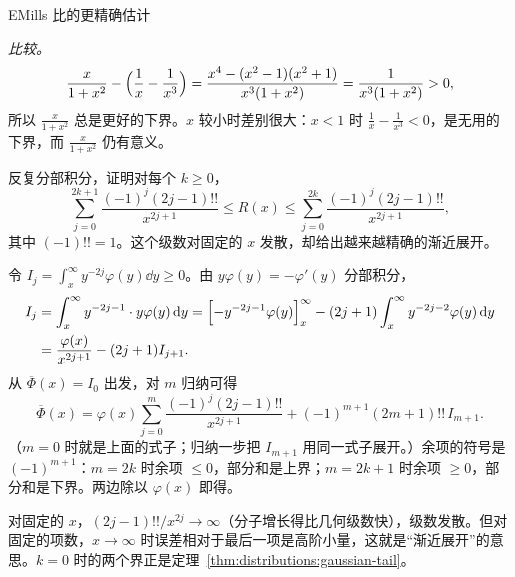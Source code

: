 \begin{probleme}[问题]{E}{Mills 比的更精确估计}
\begin{questions}
\begin{solution}
\emph{比较。}
\[
\frac x{1+x^2}-\Bigl(\frac1x-\frac1{x^3}\Bigr)=\frac{x^4-(x^2-1)(x^2+1)}{x^3(1+x^2)}=\frac1{x^3(1+x^2)}>0,
\]
所以 $\frac x{1+x^2}$ 总是更好的下界。$x$ 较小时差别很大：$x<1$ 时 $\frac1x-\frac1{x^3}<0$，是无用的下界，而 $\frac x{1+x^2}$ 仍有意义。
\end{solution}
\item 反复分部积分，证明对每个 $k\geqslant0$，
\[
\sum_{j=0}^{2k+1}\frac{(-1)^j(2j-1)!!}{x^{2j+1}}\leqslant R(x)\leqslant\sum_{j=0}^{2k}\frac{(-1)^j(2j-1)!!}{x^{2j+1}},
\]
其中 $(-1)!!=1$。这个级数对固定的 $x$ 发散，却给出越来越精确的渐近展开。
\begin{solution}
令 $I_j=\int_x^\infty y^{-2j}\varphi(y)\dd y\geqslant0$。由 $y\varphi(y)=-\varphi'(y)$ 分部积分，
\[
\begin{aligned}
I_j&=\int_x^\infty y^{-2j-1}\cdot y\varphi(y)\,\mathrm{d} y=\Bigl[-y^{-2j-1}\varphi(y)\Bigr]_x^\infty-(2j+1)\int_x^\infty y^{-2j-2}\varphi(y)\,\mathrm{d} y\\
&=\frac{\varphi(x)}{x^{2j+1}}-(2j+1)I_{j+1}.
\end{aligned}
\]
从 $\overline\Phi(x)=I_0$ 出发，对 $m$ 归纳可得
\[
\overline\Phi(x)=\varphi(x)\sum_{j=0}^m\frac{(-1)^j(2j-1)!!}{x^{2j+1}}+(-1)^{m+1}(2m+1)!!\,I_{m+1}.
\]
（$m=0$ 时就是上面的式子；归纳一步把 $I_{m+1}$ 用同一式子展开。）余项的符号是 $(-1)^{m+1}$：$m=2k$ 时余项 $\leqslant0$，部分和是上界；$m=2k+1$ 时余项 $\geqslant0$，部分和是下界。两边除以 $\varphi(x)$ 即得。

对固定的 $x$，$(2j-1)!!/x^{2j}\to\infty$（分子增长得比几何级数快），级数发散。但对固定的项数，$x\to\infty$ 时误差相对于最后一项是高阶小量，这就是“渐近展开”的意思。$k=0$ 时的两个界正是定理~\ref{thm:distributions:gaussian-tail}。
\end{solution}
\end{questions}
\end{probleme}


